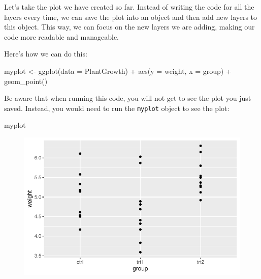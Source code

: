 \documentclass[
  letterpaper,
  DIV=11,
  numbers=noendperiod]{scrartcl}
\newenvironment{Shaded}{\begin{snugshade}}{\end{snugshade}}
\newcommand{\AttributeTok}[1]{\textcolor[rgb]{0.40,0.45,0.13}{#1}}
\newcommand{\FunctionTok}[1]{\textcolor[rgb]{0.28,0.35,0.67}{#1}}
\newcommand{\NormalTok}[1]{\textcolor[rgb]{0.00,0.23,0.31}{#1}}
\newcommand{\OtherTok}[1]{\textcolor[rgb]{0.00,0.23,0.31}{#1}}
\newcommand{\SpecialCharTok}[1]{\textcolor[rgb]{0.37,0.37,0.37}{#1}}
\begin{document}
Let's take the plot we have created so far. Instead of writing the code
for all the layers every time, we can save the plot into an object and
then add new layers to this object. This way, we can focus on the new
layers we are adding, making our code more readable and manageable.

Here's how we can do this:

\begin{Shaded}
\begin{Highlighting}[]
\NormalTok{myplot }\OtherTok{\textless{}{-}} \FunctionTok{ggplot}\NormalTok{(}\AttributeTok{data =}\NormalTok{ PlantGrowth) }\SpecialCharTok{+}
  \FunctionTok{aes}\NormalTok{(}\AttributeTok{y =}\NormalTok{ weight, }\AttributeTok{x =}\NormalTok{ group) }\SpecialCharTok{+}
  \FunctionTok{geom\_point}\NormalTok{()}
\end{Highlighting}
\end{Shaded}

Be aware that when running this code, you will not get to see the plot
you just saved. Instead, you would need to run the \texttt{myplot}
object to see the plot:

\begin{Shaded}
\begin{Highlighting}[]
\NormalTok{myplot}
\end{Highlighting}
\end{Shaded}

\begin{figure}[H]

{\centering \includegraphics{ggplot2intro_files/figure-pdf/unnamed-chunk-6-1.pdf}

}

\end{figure}
\end{document}
